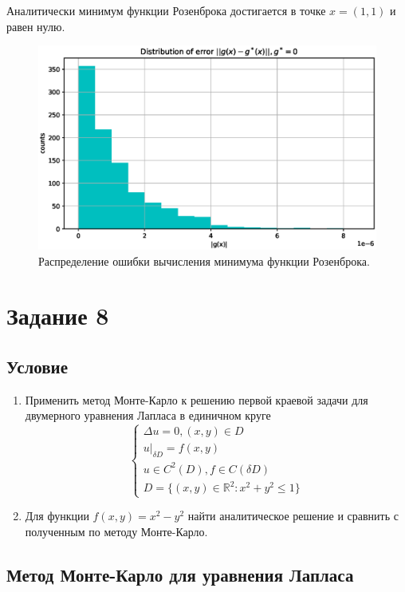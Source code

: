 \documentclass[11pt]{report}
\begin{document}
Аналитически минимум функции Розенброка достигается в точке $x=(1,1)$ и равен нулю.

\begin{figure}[H]
    \centering
    \includegraphics[width=0.9\linewidth]{images/rosenbrock-error.eps}
    \caption{Распределение ошибки вычисления минимума функции Розенброка.}
    \label{fig:rosenbrock-error}
\end{figure}

\section{Задание 8}

\subsection{Условие}

\begin{enumerate}

\item Применить метод Монте-Карло к решению первой краевой задачи для двумерного уравнения Лапласа в единичном круге
$$
\begin{cases}
\Delta u = 0,(x,y)\in D \\
u\vert_{\delta D} = f(x,y) \\
u\in C^2(D), f\in C(\delta D) \\
D=\{(x,y)\in\mathbb{R}^2: x^2+y^2\leqslant 1 \}
\end{cases}
$$

\item Для функции $f(x,y) = x^2-y^2$ найти аналитическое решение и сравнить с полученным по методу Монте-Карло.

\end{enumerate}

\subsection{Метод Монте-Карло для уравнения Лапласа}
\end{document}
